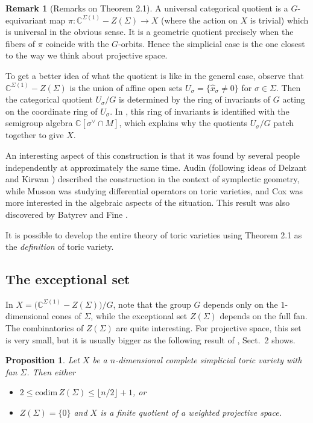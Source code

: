 \documentclass{amsart}
\theoremstyle{plain}
\newtheorem{proposition}[theorem]{Proposition}
\theoremstyle{definition}
\newtheorem*{remark}{Remark}
\begin{document}
\begin{remark}[Remarks on Theorem 2.1] A universal categorical quotient is
a $G$-equi\-variant map $\pi : \mathbb{C}^{\Sigma(1)} -Z(\Sigma) \to X$
(where the action on $X$ is trivial) which is universal in the obvious
sense.  It is a geometric quotient precisely when the fibers of $\pi$
coincide with the $G$-orbits.  Hence the simplicial case is the one
closest to the way we think about projective space.

	To get a better idea of what the quotient is like in the
general case, observe that $\mathbb{C}^{\Sigma(1)} -Z(\Sigma)$ is the
union of affine open sets $U_\sigma = \{\hat x_\sigma \ne 0\}$ for
$\sigma \in \Sigma$.  Then the categorical quotient $U_\sigma/G$ is
determined by the ring of invariants of $G$ acting on the coordinate
ring of $U_\sigma$.  In \cite{Cox2}, this ring of invariants is
identified with the semigroup algebra $\mathbb{C}[\sigma^\vee\cap M]$,
which explains why the quotients $U_\sigma/G$ patch together to give
$X$.

	An interesting aspect of this construction is that it was
found by several people independently at approximately the same time.
Audin \cite{Aud} (following ideas of Delzant \cite{Del} and Kirwan
\cite{Kir}) described the construction in the context of symplectic
geometry, while Musson \cite{Mus} was studying differential operators
on toric varieties, and Cox \cite{Cox2} was more interested in the
algebraic aspects of the situation.  This result was also discovered
by Batyrev \cite{Bat3} and Fine \cite{Fin}.

	It is possible to develop the entire theory of toric
varieties using Theorem 2.1 as the {\it definition\/} of toric
variety.
\end{remark}

	\subsection{The exceptional set} In $X =
\big(\mathbb{C}^{\Sigma(1)} -Z(\Sigma)\big)/G$, note that the group $G$
depends only on the $1$-dimensional cones of $\Sigma$, while the
exceptional set $Z(\Sigma)$ depends on the full fan.  The
combinatorics of $Z(\Sigma)$ are quite interesting.  For projective
space, this set is very small, but it is usually bigger as the
following result of \cite{BC}, Sect.~2 shows.

\begin{proposition} Let $X$ be a $n$-dimensional complete
simplicial toric variety with fan $\Sigma$.  Then either
\begin{itemize}
\item $2 \le \mathrm{codim}\, Z(\Sigma) \le \lfloor n/2\rfloor +1$, or
\item $Z(\Sigma) = \{0\}$ and $X$ is a finite quotient of a weighted
projective space. 
\end{itemize}
\end{proposition}
\end{document}
